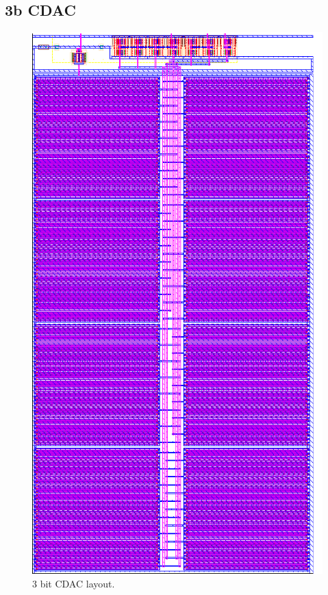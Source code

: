 		\subsection{3b CDAC}
			\begin{figure}[htb!]
			        \centering
			        \includegraphics[height=0.85\textheight, angle=0]{./figs/layout/layout_cdac_3b}
			    \caption{3 bit CDAC layout.}
			\end{figure}
		\FloatBarrier\pagebreak
